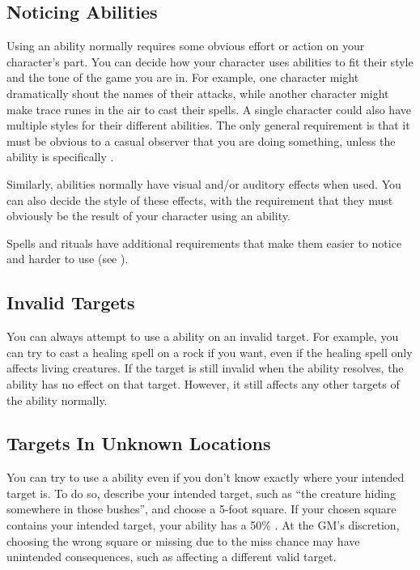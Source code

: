   \subsection{Noticing Abilities}
    Using an ability normally requires some obvious effort or action on your character's part.
    You can decide how your character uses abilities to fit their style and the tone of the game you are in.
    For example, one character might dramatically shout the names of their attacks, while another character might make trace runes in the air to cast their spells.
    A single character could also have multiple styles for their different abilities.
    The only general requirement is that it must be obvious to a casual observer that you are doing something, unless the ability is specifically .

    Similarly, abilities normally have visual and/or auditory effects when used.
    You can also decide the style of these effects, with the requirement that they must obviously be the result of your character using an ability.

    Spells and rituals have additional requirements that make them easier to notice and harder to use (see ).

  \subsection{Invalid Targets}
    You can always attempt to use a  ability on an invalid target.
    For example, you can try to cast a healing spell on a rock if you want, even if the healing spell only affects living creatures.
    If the target is still invalid when the ability resolves, the ability has no effect on that target.
    However, it still affects any other targets of the ability normally.

  \subsection{Targets In Unknown Locations}
    You can try to use a  ability even if you don't know exactly where your intended target is.
    To do so, describe your intended target, such as ``the creature hiding somewhere in those bushes'', and choose a 5-foot square.
    If your chosen square contains your intended target, your ability has a 50\% .
    At the GM's discretion, choosing the wrong square or missing due to the miss chance may have unintended consequences, such as affecting a different valid target.

